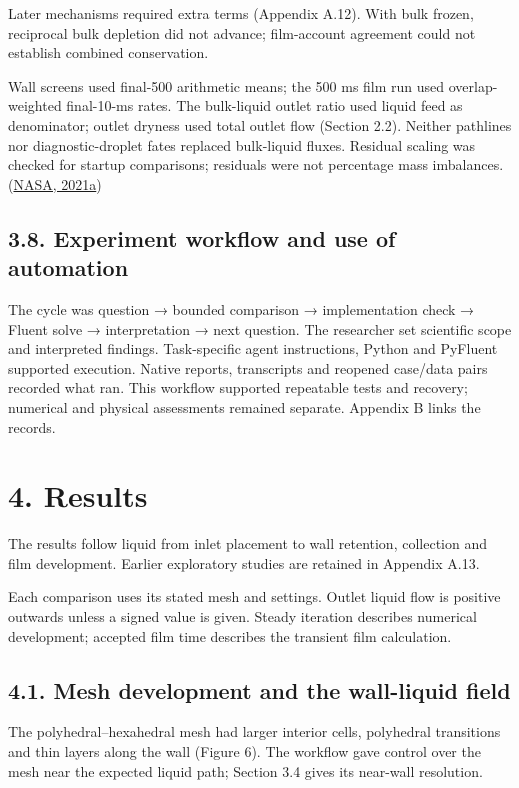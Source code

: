 \documentclass[
  12pt,
  a4paper,
]{article}
\begin{document}
Later mechanisms required extra terms (Appendix A.12). With bulk frozen,
reciprocal bulk depletion did not advance; film-account agreement could
not establish combined conservation.

Wall screens used final-500 arithmetic means; the 500 ms film run used
overlap-weighted final-10-ms rates. The bulk-liquid outlet ratio used
liquid feed as denominator; outlet dryness used total outlet flow
(Section 2.2). Neither pathlines nor diagnostic-droplet fates replaced
bulk-liquid fluxes. Residual scaling was checked for startup
comparisons; residuals were not percentage mass imbalances.
(\href{https://www.grc.nasa.gov/www/wind/valid/tutorial/iterconv.html}{NASA,
2021a})

\subsection{3.8. Experiment workflow and use of
automation}\label{experiment-workflow-and-use-of-automation}

The cycle was question → bounded comparison → implementation check →
Fluent solve → interpretation → next question. The researcher set
scientific scope and interpreted findings. Task-specific agent
instructions, Python and PyFluent supported execution. Native reports,
transcripts and reopened case/data pairs recorded what ran. This
workflow supported repeatable tests and recovery; numerical and physical
assessments remained separate. Appendix B links the records.

\section{4. Results}\label{results}

The results follow liquid from inlet placement to wall retention,
collection and film development. Earlier exploratory studies are
retained in Appendix A.13.

Each comparison uses its stated mesh and settings. Outlet liquid flow is
positive outwards unless a signed value is given. Steady iteration
describes numerical development; accepted film time describes the
transient film calculation.

\subsection{4.1. Mesh development and the wall-liquid
field}\label{mesh-development-and-the-wall-liquid-field}

The polyhedral--hexahedral mesh had larger interior cells, polyhedral
transitions and thin layers along the wall (Figure 6). The workflow gave
control over the mesh near the expected liquid path; Section 3.4 gives
its near-wall resolution.
\end{document}
